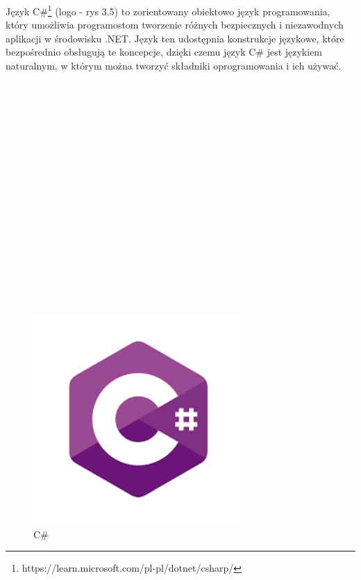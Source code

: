 \hspace*{0.60cm}Język C\#\footnote{ https://learn.microsoft.com/pl-pl/dotnet/csharp/} (logo - rys 3.5) to zorientowany obiektowo język programowania, który umożliwia programostom tworzenie różnych bezpiecznych i niezawodnych aplikacji w środowisku .NET. Język ten udostępnia konstrukcje językowe, które bezpośrednio obsługują te koncepcje, dzięki czemu język C\# jest językiem naturalnym, w którym można tworzyć składniki oprogramowania i ich używać.
\\
\\
\\
\\
\\
\\
\\
\\
\\
\\
\\
\\
\\
\\
\\
\\
\\
\\
	\begin{figure}[!htb]
	\begin{center}
		\includegraphics[width=8cm]{rys/c.png}
		\caption{C\#}
		\label{rys:rysunek001}
	\end{center}
\end{figure}
